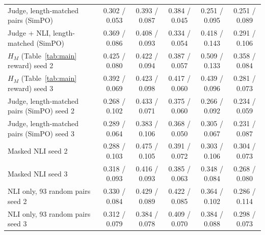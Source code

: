\begin{table}[h]
{\begin{tabular}{lccccc}
Judge, length-matched pairs (SimPO) & 0.302 / 0.053 & 0.393 / 0.087 & 0.384 / 0.045 & 0.251 / 0.095 & 0.251 / 0.089 \\
Judge + NLI, length-matched (SimPO) & 0.369 / 0.086 & 0.408 / 0.093 & 0.334 / 0.054 & 0.418 / 0.143 & 0.291 / 0.106 \\
$H_M$ (Table~\ref{tab:main} reward) seed 2 & 0.425 / 0.080 & 0.422 / 0.094 & 0.387 / 0.057 & 0.509 / 0.133 & 0.358 / 0.084 \\
$H_M$ (Table~\ref{tab:main} reward) seed 3 & 0.392 / 0.069 & 0.423 / 0.098 & 0.417 / 0.060 & 0.439 / 0.096 & 0.281 / 0.073 \\
Judge, length-matched pairs (SimPO) seed 2 & 0.268 / 0.102 & 0.433 / 0.071 & 0.375 / 0.060 & 0.266 / 0.092 & 0.234 / 0.059 \\
Judge, length-matched pairs (SimPO) seed 3 & 0.289 / 0.064 & 0.383 / 0.106 & 0.368 / 0.050 & 0.305 / 0.067 & 0.231 / 0.087 \\
Masked NLI seed 2 & 0.288 / 0.103 & 0.475 / 0.105 & 0.391 / 0.072 & 0.303 / 0.106 & 0.304 / 0.073 \\
Masked NLI seed 3 & 0.318 / 0.093 & 0.416 / 0.093 & 0.385 / 0.063 & 0.348 / 0.084 & 0.268 / 0.080 \\
NLI only, 93 random pairs seed 2 & 0.330 / 0.084 & 0.429 / 0.089 & 0.422 / 0.085 & 0.364 / 0.102 & 0.286 / 0.114 \\
NLI only, 93 random pairs seed 3 & 0.312 / 0.079 & 0.384 / 0.078 & 0.409 / 0.070 & 0.384 / 0.088 & 0.298 / 0.073 \\
\bottomrule
\end{tabular}}
\end{table}
